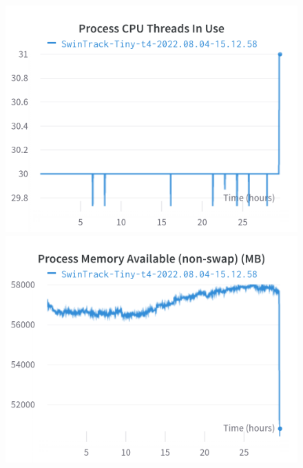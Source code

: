 \documentclass{article}
\begin{document}
\begin{figure}[h]
\includegraphics[width=\linewidth]{charts/Section-4-Panel-14-uz0nd6vdh}
\caption{}
\endminipage\hfill
{}
\includegraphics[width=\linewidth]{charts/Section-4-Panel-15-qp8ac1gsv}
\caption{}
\endminipage
\end{figure}
\end{document}
